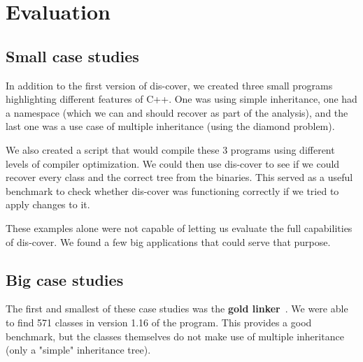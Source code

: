 \documentclass[a4paper,11pt,oneside]{report}
\begin{document}



\chapter{Evaluation}



\section{Small case studies}

In addition to the first version of dis-cover, we created three small programs highlighting different features of C++.
One was using simple inheritance,
one had a namespace (which we can and should recover as part of the analysis),
and the last one was a use case of multiple inheritance (using the diamond problem).

We also created a script that would compile these 3 programs using different levels of compiler optimization.
We could then use dis-cover to see if we could recover every class and the correct tree from the binaries.
This served as a useful benchmark to check whether dis-cover was functioning correctly if we tried to apply changes to it.

These examples alone were not capable of letting us evaluate the full capabilities of dis-cover.
We found a few big applications that could serve that purpose.

\section{Big case studies}

The first and smallest of these case studies was the \textbf{gold linker}~\cite{gold}.
We were able to find 571 classes in version 1.16 of the program.
This provides a good benchmark, but the classes themselves do not make use of multiple inheritance (only a "simple" inheritance tree).
\end{document}
